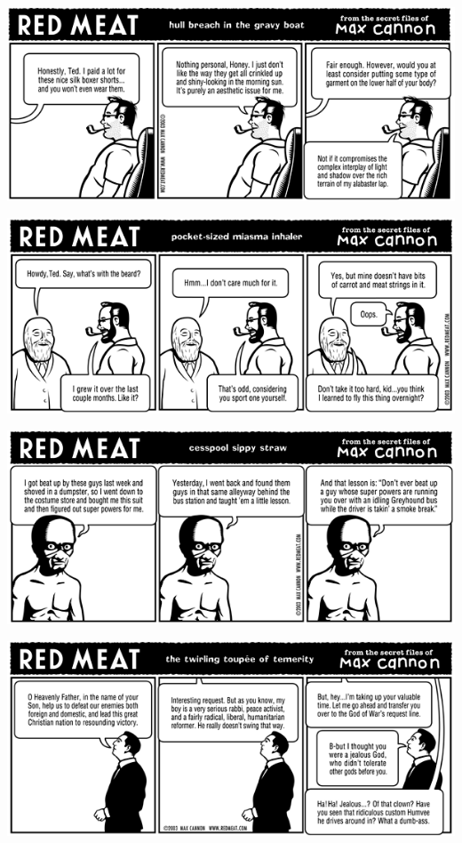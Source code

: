 \documentclass[a4paper,twoside,11pt]{article}
\begin{document}
\includegraphics[width=\textwidth]{redmeat_2003-10-28.png}



\includegraphics[width=\textwidth]{redmeat_2003-11-04.png}



\includegraphics[width=\textwidth]{redmeat_2003-11-11.png}



\includegraphics[width=\textwidth]{redmeat_2003-11-18.png}
\end{document}
